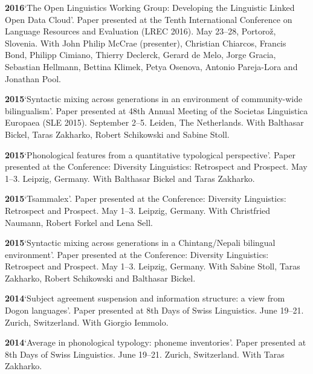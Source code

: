 \documentclass[11pt]{article}
\newcommand{\hangpara}{
 \setlength{\parindent}{0in} %
 \hangindent=0.42in %
}
\begin{document}
\vskip 6pt
\hangpara
{\bf 2016}\hspace{1ex}`The Open Linguistics Working Group: Developing the Linguistic Linked Open Data Cloud'. Paper presented at the Tenth International Conference on Language Resources and Evaluation (LREC 2016). May 23--28, Portorož, Slovenia. With John Philip McCrae (presenter), Christian Chiarcos, Francis Bond, Philipp Cimiano, Thierry Declerck, Gerard de Melo, Jorge Gracia, Sebastian Hellmann, Bettina Klimek, Petya Osenova, Antonio Pareja-Lora and Jonathan Pool. 

\vskip 6pt
\hangpara
{\bf 2015}\hspace{1ex}`Syntactic mixing across generations in an environment of community-wide bilingualism'. Paper presented at 48th Annual Meeting of the Societas Linguistica Europaea (SLE 2015). September 2--5. Leiden, The Netherlands. With Balthasar Bickel, Taras Zakharko, Robert Schikowski and Sabine Stoll.

\vskip 6pt
\hangpara
{\bf 2015}\hspace{1ex}`Phonological features from a quantitative typological perspective'. Paper presented at the Conference: Diversity Linguistics: Retrospect and Prospect. May 1--3. Leipzig, Germany. With Balthasar Bickel and Taras Zakharko.

\vskip 6pt
\hangpara
{\bf 2015}\hspace{1ex}`Tsammalex'. Paper presented at the Conference: Diversity Linguistics: Retrospect and Prospect. May 1--3. Leipzig, Germany. With Christfried Naumann, Robert Forkel and Lena Sell.

\vskip 6pt
\hangpara
{\bf 2015}\hspace{1ex}`Syntactic mixing across generations in a Chintang/Nepali bilingual environment'. Paper presented at the Conference: Diversity Linguistics: Retrospect and Prospect. May 1--3. Leipzig, Germany. With Sabine Stoll, Taras Zakharko, Robert Schikowski and Balthasar Bickel.

\vskip 6pt
\hangpara
{\bf 2014}\hspace{1ex}`Subject agreement suspension and information structure: a view from Dogon languages'. Paper presented at 8th Days of Swiss Linguistics. June 19--21. Zurich, Switzerland. With Giorgio Iemmolo.

\vskip 6pt
\hangpara
{\bf 2014}\hspace{1ex}`Average in phonological typology: phoneme inventories'. Paper presented at 8th Days of Swiss Linguistics. June 19--21. Zurich, Switzerland. With Taras Zakharko.
\end{document}
